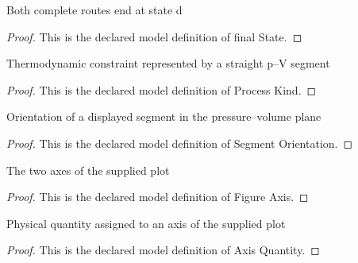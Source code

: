 \begin{definition}
  \label{def:physics:phyx-mini-0471:phyxminiproblems-problemphyxmini0471-processpath-finalstate}
  Both complete routes end at state d
\end{definition}
\begin{proof}
  This is the declared model definition of final State.
\end{proof}
\begin{definition}
  \label{def:physics:phyx-mini-0471:phyxminiproblems-problemphyxmini0471-processkind}
  Thermodynamic constraint represented by a straight p--V segment
\end{definition}
\begin{proof}
  This is the declared model definition of Process Kind.
\end{proof}
\begin{definition}
  \label{def:physics:phyx-mini-0471:phyxminiproblems-problemphyxmini0471-segmentorientation}
  Orientation of a displayed segment in the pressure--volume plane
\end{definition}
\begin{proof}
  This is the declared model definition of Segment Orientation.
\end{proof}
\begin{definition}
  \label{def:physics:phyx-mini-0471:phyxminiproblems-problemphyxmini0471-figureaxis}
  The two axes of the supplied plot
\end{definition}
\begin{proof}
  This is the declared model definition of Figure Axis.
\end{proof}
\begin{definition}
  \label{def:physics:phyx-mini-0471:phyxminiproblems-problemphyxmini0471-axisquantity}
  Physical quantity assigned to an axis of the supplied plot
\end{definition}
\begin{proof}
  This is the declared model definition of Axis Quantity.
\end{proof}
